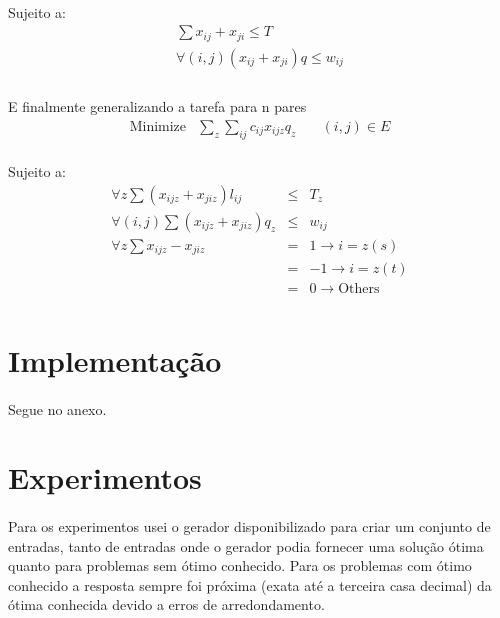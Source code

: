 \documentclass{article}
\begin{document}
\paragraph{} Sujeito a:
\begin{align*}
  \sum{x_{ij}+x_{ji}} \le T\\
  \forall (i,j) (x_{ij}+x_{ji})q \le w_{ij}\\
\end{align*}
\paragraph{} E finalmente generalizando a tarefa para n pares
\begin{align*}
  \text{Minimize} &\sum_{z}{\sum_{ij}{c_{ij}x_{ijz}q_z}}& \quad (i,j) \in E
\end{align*}
\paragraph{} Sujeito a:
\begin{align*}
  \forall z \sum{(x_{ijz}+x_{jiz})l_{ij}} &\le& T_z\\
  \forall (i,j) \sum{(x_{ijz}+x_{jiz})q_z} &\le& w_{ij}\\
  \forall z \sum{x_{ijz}-x_{jiz}} &=& 1 \rightarrow i=z(s)\\
  &=& -1 \rightarrow i = z(t)\\
  &=& 0 \rightarrow \text{Others}\\
\end{align*}
\section*{Implementação}
\paragraph{} Segue no anexo.
\section*{Experimentos}
\paragraph{} Para os experimentos usei o gerador disponibilizado para
criar um conjunto de entradas, tanto de entradas onde o gerador podia
fornecer uma solução ótima quanto para problemas sem ótimo
conhecido. Para os problemas com ótimo conhecido a resposta sempre foi
próxima (exata até a terceira casa decimal) da ótima conhecida devido
a erros de arredondamento.
\end{document}
